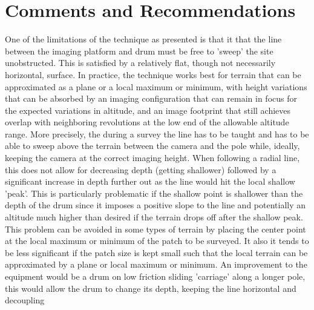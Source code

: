 \section{Comments and Recommendations}


One of the limitations of the technique as presented is that it that the line between the imaging platform and drum must be free to 'sweep' the site unobstructed. This is satisfied by a relatively flat, though not necessarily horizontal, surface. In practice, the technique works best for terrain that can be approximated as a plane or a local maximum or minimum, with height variations that can be absorbed by an imaging configuration that can remain in focus for the expected variations in altitude, and an image footprint that still achieves overlap with neighboring revolutions at the low end of the allowable altitude range.
More precisely, the during a survey the line has to be taught and has to be able to sweep above the terrain between the camera and the pole while, ideally, keeping the camera at the correct imaging height. When following a radial line, this does not allow for decreasing depth (getting shallower) followed by a significant increase in depth further out as the line would hit the local shallow 'peak'. This is particularly problematic if the shallow point is shallower than the depth of the drum since it imposes a positive slope to the line and potentially an altitude much higher than desired if the terrain drops off after the shallow peak. This problem can be avoided in some types of terrain by placing the center point at the local maximum or minimum of the patch to be surveyed. It also it tends to be less significant if the patch size is kept small such that the local terrain can be approximated by a plane or local maximum or minimum.
An improvement to the equipment would be a drum on low friction sliding 'carriage' along a longer pole, this would allow the drum to change its depth, keeping the line horizontal and decoupling 